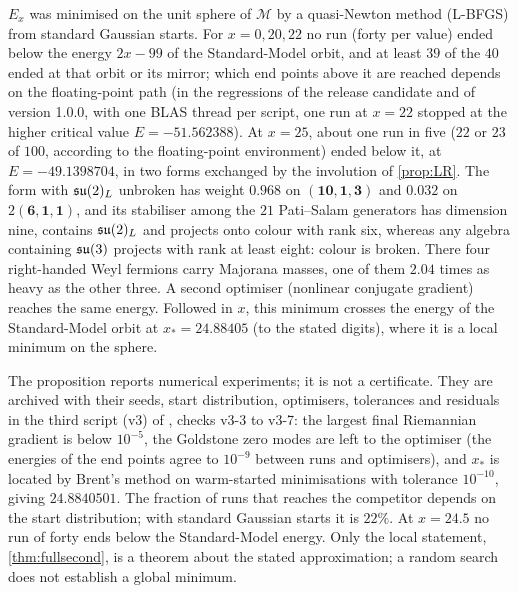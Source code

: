 \begin{proposition}
\label{prop:randomstart}
$E_x$ was minimised on the unit sphere of $\mathcal M$ by a quasi-Newton method (L-BFGS) from standard Gaussian starts. For $x=0,20,22$ no run (forty per value)
ended below the energy $2x-99$ of the Standard-Model orbit, and at least $39$ of the $40$ ended at that orbit or its mirror; which end points above it
are reached depends on the floating-point path (in the regressions of the release candidate and of version 1.0.0, with one BLAS thread per
script, one run at $x=22$ stopped at the higher critical value $E=-51.562388$). At $x=25$, about one run in five ($22$ or $23$ of $100$, according to the floating-point environment) ended below it, at $E=-49.1398704$, in two forms exchanged by
the involution of \cref{prop:LR}. The form with $\mathfrak{su}(2)_L$ unbroken has weight $0.968$ on $(\mathbf{10},\mathbf1,\mathbf3)$ and $0.032$ on $2(\mathbf6,\mathbf1,\mathbf1)$, and its stabiliser
among the $21$ Pati--Salam generators has dimension nine, contains $\mathfrak{su}(2)_L$ and projects onto colour with rank six, whereas any algebra containing $\mathfrak{su}(3)$ projects with
rank at least eight: colour is broken. There four right-handed Weyl fermions carry Majorana masses, one of them $2.04$ times as heavy as the other three. A second
optimiser (nonlinear conjugate gradient) reaches the same energy. Followed in $x$, this minimum crosses the energy of the Standard-Model orbit at
$x_*=24.88405$ (to the stated digits), where it is a local minimum on the sphere.
\end{proposition}

The proposition reports numerical experiments; it is not a certificate. They are archived with their seeds, start distribution, optimisers, tolerances and
residuals in the third script (v3) of , checks v3-3 to v3-7: the largest final Riemannian gradient is below $10^{-5}$, the Goldstone zero modes are
left to the optimiser (the energies of the end points agree to $10^{-9}$ between runs and optimisers), and $x_*$ is located by Brent's method on warm-started
minimisations with tolerance $10^{-10}$, giving $24.8840501$. The fraction of runs that reaches the competitor depends on the start distribution; with standard Gaussian starts it is $22\%$. At $x=24.5$ no run of forty ends below the Standard-Model energy. Only the local statement,
\cref{thm:fullsecond}, is a theorem about the stated approximation; a random search does not establish a global minimum.

